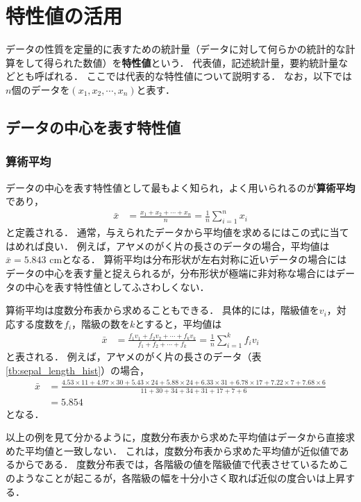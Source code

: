 \clearpage
\section{特性値の活用}
%
データの性質を定量的に表すための統計量（データに対して何らかの統計的な計算をして得られた数値）を\textbf{特性値}という．
%
代表値，記述統計量，要約統計量などとも呼ばれる．
%
ここでは代表的な特性値について説明する．
%
なお，以下では$ n $個のデータを$ (x_{1}, x_{2}, \cdots, x_{n}) $と表す．

\subsection{データの中心を表す特性値}

\subsubsection*{算術平均}
%
データの中心を表す特性値として最もよく知られ，よく用いられるのが\textbf{算術平均}であり，
%
\begin{align}
	\bar{x} &= \frac{x_{1}+x_{2}+\cdots+x_{n}}{n} = \frac{1}{n} \sum_{i=1}^{n}x_{i}
	\label{eq:arithmetic_mean}
\end{align}
%
と定義される．
%
通常，与えられたデータから平均値を求めるにはこの式に当てはめれば良い．
%
例えば，アヤメのがく片の長さのデータの場合，平均値は$ \bar{x}=5.843 $ cmとなる．
%
算術平均は分布形状が左右対称に近いデータの場合にはデータの中心を表す量と捉えられるが，分布形状が極端に非対称な場合にはデータの中心を表す特性値としてふさわしくない．
%

%
算術平均は度数分布表から求めることもできる．
%
具体的には，階級値を$ v_{i} $，対応する度数を$ f_{i} $，階級の数を$ k $とすると，平均値は
%
\begin{align}
	\bar{x} &= \frac{f_{1}v_{1}+f_{2}v_{2}+\cdots+f_{k}v_{k}}{f_{1}+f_{2}+\cdots+f_{k}}
	= \frac{1}{n} \sum_{i=1}^{k} f_{i}v_{i}
	\label{eq:arithmetic_mean2}
\end{align}
%
と表される．
%
例えば，アヤメのがく片の長さのデータ（表\ref{tb:sepal_length_hist}）の場合，
%
\footnotesize
\begin{align*}
	\bar{x} &= \frac{4.53\times11+4.97\times30+5.43\times24+5.88\times24+6.33\times31+6.78\times17+7.22\times7+7.68\times6}{11+30+34+34+31+17+7+6}\\
	&= 5.854
\end{align*}
\normalsize
%
となる．
%

%
以上の例を見て分かるように，度数分布表から求めた平均値はデータから直接求めた平均値と一致しない．
%
これは，度数分布表から求めた平均値が近似値であるからである．
%
度数分布表では，各階級の値を階級値で代表させているためこのようなことが起こるが，各階級の幅を十分小さく取れば近似の度合いは上昇する．
%

